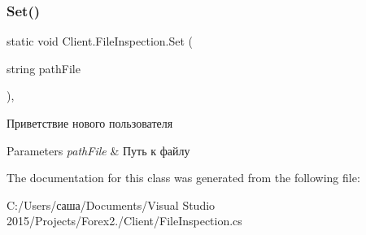 \subsubsection{\texorpdfstring{Set()}{Set()}}
{\footnotesize\ttfamily static void Client.\+File\+Inspection.\+Set (\begin{DoxyParamCaption}\item[{string}]{path\+File }\end{DoxyParamCaption})\hspace{0.3cm}{\ttfamily [inline]}, {\ttfamily [static]}}



Приветствие нового пользователя 


\begin{DoxyParams}{Parameters}
{\em path\+File} & Путь к файлу \\
\hline
\end{DoxyParams}


The documentation for this class was generated from the following file\+:\begin{DoxyCompactItemize}
\item 
C\+:/\+Users/саша/\+Documents/\+Visual Studio 2015/\+Projects/\+Forex2./\+Client/File\+Inspection.\+cs\end{DoxyCompactItemize}
